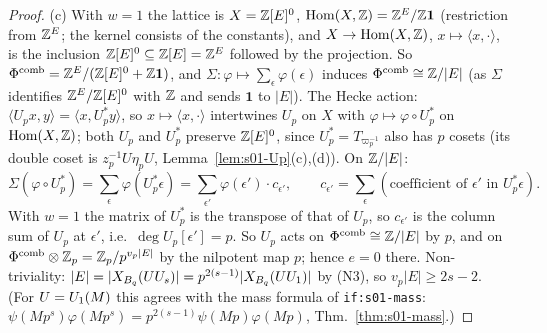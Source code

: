 \begin{proof}
(c) With $w=1$ the lattice is $X=\mathbb{Z}[E]^0$, $\operatorname{Hom}(X,\mathbb{Z})=\mathbb{Z}^E/\mathbb{Z}\mathbf 1$ (restriction from $\mathbb{Z}^E$; the kernel consists of the
constants), and $X\to\operatorname{Hom}(X,\mathbb{Z})$, $x\mapsto\langle x,\cdot\rangle$, is the inclusion $\mathbb{Z}[E]^0\subseteq\mathbb{Z}[E]=\mathbb{Z}^E$ followed by the
projection. So $\Phi^{\mathrm{comb}}=\mathbb{Z}^E/(\mathbb{Z}[E]^0+\mathbb{Z}\mathbf 1)$, and $\Sigma:\varphi\mapsto\sum_\epsilon\varphi(\epsilon)$ induces
$\Phi^{\mathrm{comb}}\cong\mathbb{Z}/|E|$ (as $\Sigma$ identifies $\mathbb{Z}^E/\mathbb{Z}[E]^0$ with $\mathbb{Z}$ and sends $\mathbf1$ to $|E|$). The Hecke action:
$\langle U_px,y\rangle=\langle x,U_p^*y\rangle$, so $x\mapsto\langle x,\cdot\rangle$ intertwines $U_p$ on $X$ with
$\varphi\mapsto\varphi\circ U_p^*$ on $\operatorname{Hom}(X,\mathbb{Z})$; both $U_p$ and $U_p^*$ preserve $\mathbb{Z}[E]^0$, since $U_p^*=T_{\varpi_p^{-1}}$ also has
$p$ cosets (its double coset is $z_p^{-1}U\eta_pU$, Lemma~\ref{lem:s01-Up}(c),(d)). On $\mathbb{Z}/|E|$:
\[\Sigma(\varphi\circ U_p^*)=\sum_\epsilon\varphi(U_p^*\epsilon)=\sum_{\epsilon'}\varphi(\epsilon')\cdot c_{\epsilon'},\qquad
c_{\epsilon'}=\sum_\epsilon(\text{coefficient of }\epsilon'\text{ in }U_p^*\epsilon).\]
With $w=1$ the matrix of $U_p^*$ is the transpose of that of $U_p$, so $c_{\epsilon'}$ is the column sum of $U_p$ at $\epsilon'$, i.e.\
$\deg U_p[\epsilon']=p$. So $U_p$ acts on $\Phi^{\mathrm{comb}}\cong\mathbb{Z}/|E|$ by $p$, and on $\Phi^{\mathrm{comb}}\otimes\mathbb{Z}_p=\mathbb{Z}_p/p^{v_p|E|}$ by the nilpotent
map $p$; hence $e=0$ there. Non-triviality: $|E|=|X_{B_q}(UU_s)|=p^{2(s-1)}|X_{B_q}(UU_1)|$ by (N3), so $v_p|E|\ge2s-2$. (For $U=U_1(M)$
this agrees with the mass formula of \texttt{if:s01-mass}: $\psi(Mp^s)\varphi(Mp^s)=p^{2(s-1)}\psi(Mp)\varphi(Mp)$, Thm.~\ref{thm:s01-mass}.)


\end{proof}
